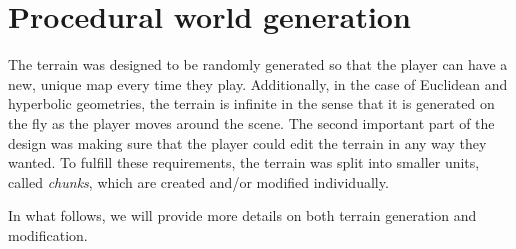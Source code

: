 \section{Procedural world generation} \label{sec:implementation_terrain}
The terrain was designed to be randomly generated so that the player can have a new, unique map every time they play.
Additionally, in the case of Euclidean and hyperbolic geometries, the terrain is infinite in the sense that it is generated on the fly as the player moves around the scene.
The second important part of the design was making sure that the player could edit the terrain in any way they wanted.
To fulfill these requirements, the terrain was split into smaller units, called \textit{chunks}, which are created and/or modified individually.

In what follows, we will provide more details on both terrain generation and modification.





